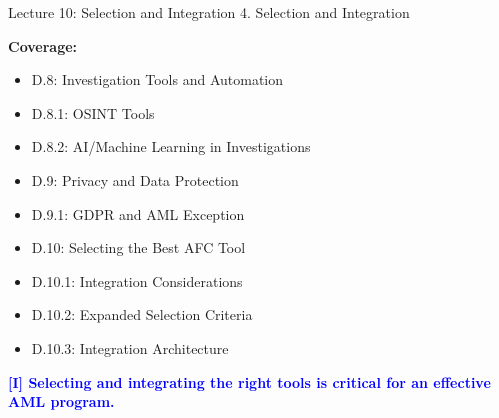 \documentclass[11pt,a4paper]{beamer}
\newcommand{\bluenote}[1]{\textcolor{blue}{\textbf{[I] #1}}}
\begin{document}
\begin{frame}{Lecture 10: Selection and Integration}
	\centering
	\Large 4. Selection and Integration
	\vspace{0.5cm}
	
	\textbf{Coverage:}
	\begin{itemize}
		\item D.8: Investigation Tools and Automation
		\item D.8.1: OSINT Tools
		\item D.8.2: AI/Machine Learning in Investigations
		\item D.9: Privacy and Data Protection
		\item D.9.1: GDPR and AML Exception
		\item D.10: Selecting the Best AFC Tool
		\item D.10.1: Integration Considerations
		\item D.10.2: Expanded Selection Criteria
		\item D.10.3: Integration Architecture
	\end{itemize}
	\bluenote{Selecting and integrating the right tools is critical for an effective AML program.}
\end{frame}


\end{document}

